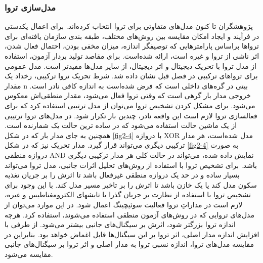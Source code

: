 \subsubsection {مدل‌سازی تروا}
پژوهشگران تا کنون مدل‌های متفاوتی برای تروا انتخاب کرده‌اند. برای اعمال یکدستی در فرآیند و ایجاد امکان مقایسه بین روش‌های مختلف، طبقه بندی سازمان یافته‌ای برای تروا‌ها براساس پارامترهایی که توصیفگر اندازه، میزان مخفی بودن، احتمال فعال شدن، اثر ناشی از تروا و غیره است، ارائه شده‌است. برای مقاصد تولید بردار آزمون، استفاده از مدل تروا با تحریک دیجیتال و اثر دیجیتال، از سایر مدل‌ها مفیدتر است. 
مدل عمومی برای تروا‌های ترکیبی در فصل قبل نشان داده شد. شرط تحریک تروا ترکیبی، رخداد یک مقدار n بیتی در گره‌های داخلی است که فرض شده‌است به اندازه کافی نادر است. خروجی مدار بار گرهی است که وقتی تروا فعال می‌شود، مقدار منطقی‌اش معکوس می‌شود. برای مشکل کردن تشخیص تروا می‌توان از مدل ترتیبی استفاده کرد که برای فعالسازی تروا لازم است این واقعه نادر، چندین بار تکرار شود. در مدل‌های تروا ترتیبی از یک ماشین حالت استفاده می‌شود که در ساده ترین حالت یک شمارنده است. همچنین به جای مدار بار که در شکل \ref{fig2-4} با دروازه XOR مدل شده‌است، هر مدار ترکیبی دیگری می‌تواند قرار گیرد. مدار تحریک نیز که در شکل \ref{fig2-4} به صورت دروازه منطقی AND نمایش داده شده، می‌تواند در حالت کلی هر مدار ترکیبی دیگری باشد.
برای تشخیص تروا با استفاده از روش‌های تحلیل اثرات جانبی، مدل تروا می‌تواند بسیار ساده و در حد یک دروازه منطقی غیرفعال باشد تا اثرش را بر جریان تغذیه سکون مدل کند یا یک خازن باشد تا اثرش را بر تاخیر مسیر مدل کند. با این وجود برای تشخیص تروا با استفاده از نظارت بر جریان گذرا یا تابشهای الکترومغناطیس و غیره، لازم است در مداراتِ تروا فعالیت سوئیچینگ اعمال شود. در این موارد می‌توان از مدل‌های تروایی که در روش‌های آزمون منطقی استفاده می‌شوند، استفاده کرد. هرچه اندازه تروا بزرگتر شود، اثرش بر سیگنال‌های جانبی بیشتر می‌شود. از طرفی با افزایش اندازه مدار اصلی، اثر تروا بر این سیگنال‌ها قابل اغماض خواهد بود. بنابراین در مقایسه مدل‌های تروا، اندازه نسبی تروا به مدار اصلی و اثر تروا بر سیگنال‌های جانبی مقایسه می‌شود. 
